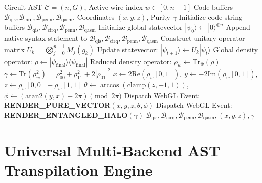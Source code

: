 \documentclass[conference]{IEEEtran}
\begin{document}
\begin{algorithm}[t]
\caption{Multi-Backend AST Transpilation and Density Purity}
\label{alg:transpile}
\begin{algorithmic}[1]
\REQUIRE Circuit AST $\mathcal{C} = (n, G)$, Active wire index $w \in [0, n-1]$
\ENSURE Code buffers $\mathcal{B}_{\text{qis}}, \mathcal{B}_{\text{cirq}}, \mathcal{B}_{\text{penn}}, \mathcal{B}_{\text{qasm}}$, Coordinates $(x,y,z)$, Purity $\gamma$
\STATE Initialize code string buffers $\mathcal{B}_{\text{qis}}, \mathcal{B}_{\text{cirq}}, \mathcal{B}_{\text{penn}}, \mathcal{B}_{\text{qasm}}$
\STATE Initialize global statevector $|\psi_0\rangle \leftarrow |0\rangle^{\otimes n}$
        \STATE Append native syntax statement to $\mathcal{B}_{\text{qis}}, \mathcal{B}_{\text{cirq}}, \mathcal{B}_{\text{penn}}, \mathcal{B}_{\text{qasm}}$
        \STATE Construct unitary operator matrix $U_k = \bigotimes_{j=0}^{n-1} M_j(g_k)$
        \STATE Update statevector: $|\psi_{t+1}\rangle \leftarrow U_k |\psi_t\rangle$
    \ENDFOR
\ENDFOR
\STATE Global density operator: $\rho \leftarrow |\psi_{\text{final}}\rangle\langle\psi_{\text{final}}|$
\STATE Reduced density operator: $\rho_w \leftarrow \text{Tr}_{\bar{w}}(\rho)$
\STATE $\gamma \leftarrow \text{Tr}(\rho_w^2) = \rho_{00}^2 + \rho_{11}^2 + 2|\rho_{01}|^2$
    \STATE $x \leftarrow 2\text{Re}(\rho_w[0,1])$, $y \leftarrow -2\text{Im}(\rho_w[0,1])$, $z \leftarrow \rho_w[0,0] - \rho_w[1,1]$
    \STATE $\theta \leftarrow \arccos(\text{clamp}(z, -1, 1))$, $\phi \leftarrow (\text{atan2}(y, x) + 2\pi) \pmod{2\pi}$
    \STATE Dispatch WebGL Event: \textbf{RENDER\_PURE\_VECTOR}$(x, y, z, \theta, \phi)$
\ELSE
    \STATE Dispatch WebGL Event: \textbf{RENDER\_ENTANGLED\_HALO}$(\gamma)$
\ENDIF
\RETURN $\mathcal{B}_{\text{qis}}, \mathcal{B}_{\text{cirq}}, \mathcal{B}_{\text{penn}}, \mathcal{B}_{\text{qasm}}, (x,y,z), \gamma$
\end{algorithmic}
\end{algorithm}

\section{Universal Multi-Backend AST Transpilation Engine}
\label{sec:transpiler}
\end{document}
